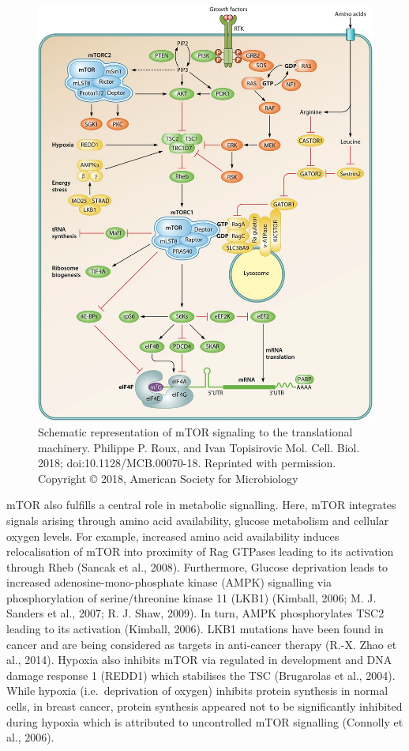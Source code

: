 \documentclass[12pt,openany]{book}
\begin{document}
\begin{figure}[ht]
 \centering
  \includegraphics{./figures/mTORsignal.jpg}
  \caption{Schematic representation of mTOR signaling to the translational machinery. Philippe P. Roux, and Ivan Topisirovic Mol. Cell. Biol. 2018; doi:10.1128/MCB.00070-18. Reprinted with permission. Copyright © 2018, American Society for Microbiology
 \label{fig:mtorsignal}}
\end{figure}

mTOR also fulfills a central role in metabolic signalling. Here, mTOR
integrates signals arising through amino acid availability, glucose
metabolism and cellular oxygen levels. For example, increased amino acid
availability induces relocalisation of mTOR into proximity of Rag
GTPases leading to its activation through Rheb (Sancak et al., 2008).
Furthermore, Glucose deprivation leads to increased
adenosine-mono-phosphate kinase (AMPK) signalling via phosphorylation of
serine/threonine kinase 11 (LKB1) (Kimball, 2006; M. J. Sanders et al.,
2007; R. J. Shaw, 2009). In turn, AMPK phosphorylates TSC2 leading to
its activation (Kimball, 2006). LKB1 mutations have been found in cancer
and are being considered as targets in anti-cancer therapy (R.-X. Zhao
et al., 2014). Hypoxia also inhibits mTOR via regulated in development
and DNA damage response 1 (REDD1) which stabilises the TSC (Brugarolas
et al., 2004). While hypoxia (i.e.~deprivation of oxygen) inhibits
protein synthesis in normal cells, in breast cancer, protein synthesis
appeared not to be significantly inhibited during hypoxia which is
attributed to uncontrolled mTOR signalling (Connolly et al., 2006).
\end{document}
